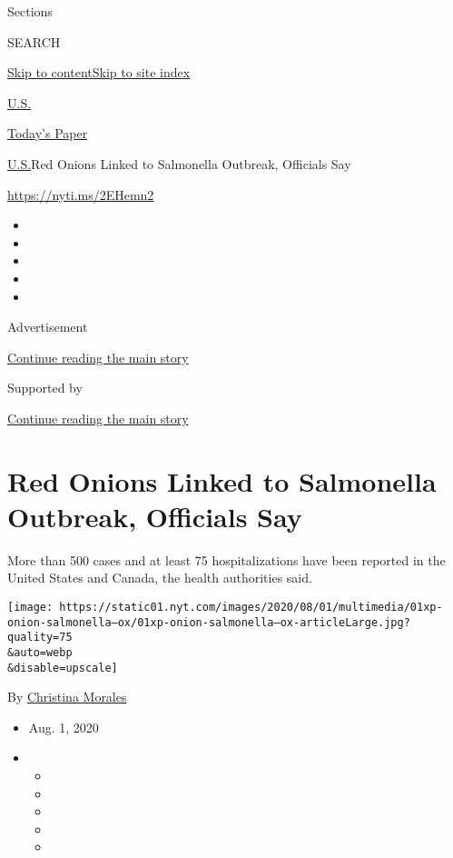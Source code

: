 Sections

SEARCH

\protect\hyperlink{site-content}{Skip to
content}\protect\hyperlink{site-index}{Skip to site index}

\href{https://www.nytimes.com/section/us}{U.S.}

\href{https://myaccount.nytimes.com/auth/login?response_type=cookie\&client_id=vi}{}

\href{https://www.nytimes.com/section/todayspaper}{Today's Paper}

\href{/section/us}{U.S.}\textbar{}Red Onions Linked to Salmonella
Outbreak, Officials Say

\url{https://nyti.ms/2EHemn2}

\begin{itemize}
\item
\item
\item
\item
\item
\end{itemize}

Advertisement

\protect\hyperlink{after-top}{Continue reading the main story}

Supported by

\protect\hyperlink{after-sponsor}{Continue reading the main story}

\hypertarget{red-onions-linked-to-salmonella-outbreak-officials-say}{%
\section{Red Onions Linked to Salmonella Outbreak, Officials
Say}\label{red-onions-linked-to-salmonella-outbreak-officials-say}}

More than 500 cases and at least 75 hospitalizations have been reported
in the United States and Canada, the health authorities said.

\texttt{[image: https://static01.nyt.com/images/2020/08/01/multimedia/01xp-onion-salmonella--ox/01xp-onion-salmonella--ox-articleLarge.jpg?quality=75\\\&auto=webp\\\&disable=upscale]}

By \href{https://www.nytimes.com/by/christina-morales}{Christina
Morales}

\begin{itemize}
\item
  Aug. 1, 2020
\item
  \begin{itemize}
  \item
  \item
  \item
  \item
  \item
  \end{itemize}
\end{itemize}

